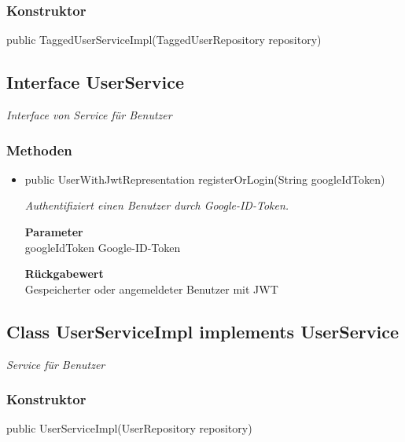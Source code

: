 \documentclass[a4paper]{scrreprt}
\begin{document}
        \subsubsection{Konstruktor}
        public TaggedUserServiceImpl(TaggedUserRepository repository)
        \subsection{Interface UserService}
        \textit{Interface von Service für Benutzer}
        \subsubsection{Methoden}
        \begin{itemize}
        	\item{public UserWithJwtRepresentation registerOrLogin(String googleIdToken)}
        	
        	\textit{Authentifiziert einen Benutzer durch Google-ID-Token.}
        	
        	\textbf{Parameter} \\
        	googleIdToken Google-ID-Token
        	
        	\textbf{Rückgabewert} \\
        	Gespeicherter oder angemeldeter Benutzer mit JWT
        \end{itemize}
        \subsection{Class UserServiceImpl implements UserService}
        \textit{Service für Benutzer}
        \subsubsection{Konstruktor}
        public UserServiceImpl(UserRepository repository)
\end{document}

